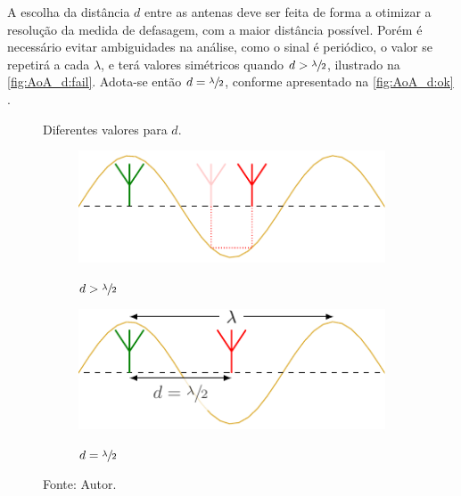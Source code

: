 A escolha da distância $d$ entre as antenas deve ser feita de forma a otimizar a resolução da medida de defasagem, com a maior distância possível. Porém é necessário evitar ambiguidades na análise, como o sinal é periódico, o valor se repetirá a cada $\lambda$, e terá valores simétricos quando $d > \sfrac{\lambda}{2}$, ilustrado na \autoref{fig:AoA_d:fail}.
Adota-se então $d=\sfrac{\lambda}{2}$, conforme apresentado na \autoref{fig:AoA_d:ok} \cite{bensky2016wireless, horst2021localization}.

\begin{figure}
    \caption{Diferentes valores para $d$.}
    \label{fig:AoA_d}

    \hfill
    \begin{subfigure}[b]{0.45\textwidth}
        \centering
        \caption{$d > \sfrac{\lambda}{2}$}
        \includegraphics{../pictures/AoA_0_fail.pdf}
        \label{fig:AoA_d:fail}
    \end{subfigure}
    \hfill
    \begin{subfigure}[b]{0.45\textwidth}
        \centering
        \caption{$d = \sfrac{\lambda}{2}$}
        \includegraphics{../pictures/AoA_0.pdf}
        \label{fig:AoA_d:ok}
    \end{subfigure}
    \hfill

    \caption*{Fonte: Autor.}
\end{figure}


















